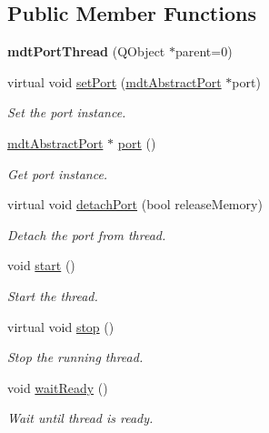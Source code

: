 \subsection*{Public Member Functions}
\begin{DoxyCompactItemize}
\item 
\hypertarget{classmdt_port_thread_aa20869c68d7a016f9e547464f0d8b71e}{
{\bfseries mdtPortThread} (QObject $\ast$parent=0)}
\label{classmdt_port_thread_aa20869c68d7a016f9e547464f0d8b71e}

\item 
virtual void \hyperlink{classmdt_port_thread_acd51474c3a2683676423317bc9cb31b2}{setPort} (\hyperlink{classmdt_abstract_port}{mdtAbstractPort} $\ast$port)
\begin{DoxyCompactList}\small\item\em Set the port instance. \end{DoxyCompactList}\item 
\hyperlink{classmdt_abstract_port}{mdtAbstractPort} $\ast$ \hyperlink{classmdt_port_thread_a97bff8cf6aca37d8858cc4e5c9294cae}{port} ()
\begin{DoxyCompactList}\small\item\em Get port instance. \end{DoxyCompactList}\item 
virtual void \hyperlink{classmdt_port_thread_a29b434534a5564efbd9dfe570a61b143}{detachPort} (bool releaseMemory)
\begin{DoxyCompactList}\small\item\em Detach the port from thread. \end{DoxyCompactList}\item 
void \hyperlink{classmdt_port_thread_a5a5c1290eaa43182d69c3f39eadbec00}{start} ()
\begin{DoxyCompactList}\small\item\em Start the thread. \end{DoxyCompactList}\item 
virtual void \hyperlink{classmdt_port_thread_a5746ea96689ed80179751ad1353f0b39}{stop} ()
\begin{DoxyCompactList}\small\item\em Stop the running thread. \end{DoxyCompactList}\item 
void \hyperlink{classmdt_port_thread_aca7473f73c6b68fe8c3e1cfc349240e7}{waitReady} ()
\begin{DoxyCompactList}\small\item\em Wait until thread is ready. \end{DoxyCompactList}\item 

\end{DoxyCompactItemize}
